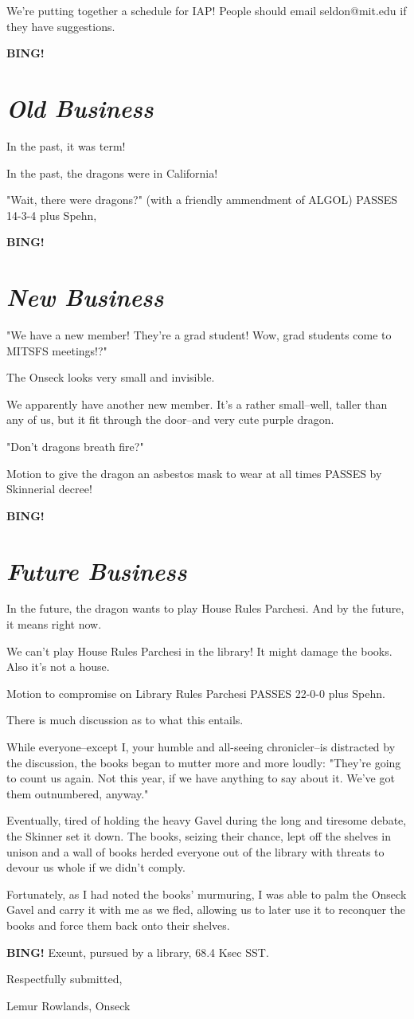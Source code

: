 \documentclass[10pt]{article}
\newcommand{\bing}{{\bf BING!} }
\newcommand{\goto}[1]{\bing \vskip 12pt \section*{{\em{#1}}}}
\newcommand{\ps}{ plus Spehn\xspace}
\newcommand{\onseck}{Lemur Rowlands, Onseck}
\begin{document}
We're putting together a schedule for IAP!  People should email seldon@mit.edu if they
have suggestions.


\goto{Old Business}

In the past, it was term!

In the past, the dragons were in California!

"Wait, there were dragons?" (with a friendly ammendment of ALGOL) PASSES 14-3-4\ps, 


\goto{New Business}

"We have a new member!  They're a grad student!  Wow, grad students come to MITSFS meetings!?"

The Onseck looks very small and invisible.

We apparently have another new member.  It's a rather small--well, taller than any of us, but
it fit through the door--and very cute purple dragon.

"Don't dragons breath fire?"

Motion to give the dragon an asbestos mask to wear at all times PASSES by Skinnerial decree!


\goto{Future Business}

In the future, the dragon wants to play House Rules Parchesi.  And by the future, it means
right now.

We can't play House Rules Parchesi in the library!  It might damage the books.  Also it's not a
house.

Motion to compromise on Library Rules Parchesi PASSES 22-0-0\ps.

There is much discussion as to what this entails.

While everyone--except I, your humble and all-seeing chronicler--is distracted by the discussion, 
the books began to mutter more and more loudly: "They're going to count us again.  Not this year,
if we have anything to say about it.  We've got them outnumbered, anyway."

Eventually, tired of holding the heavy Gavel during the long and tiresome debate, the Skinner
set it down.  The books, seizing their chance, lept off the shelves in unison and a wall of books
herded everyone out of the library with threats to devour us whole if we didn't comply.

Fortunately, as I had noted the books' murmuring, I was able to palm the Onseck Gavel and carry it
with me as we fled, allowing us to later use it to reconquer the books and force them back onto their
shelves.


\bing
\noindent
Exeunt, pursued by a library, 68.4 Ksec SST.

\vspace{18pt}

\centerline{Respectfully submitted,}
\centerline{\onseck}
\end{document}
